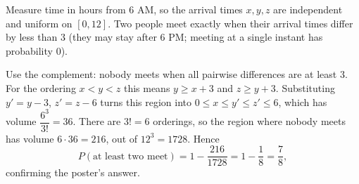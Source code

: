 Measure time in hours from 6 AM, so the arrival times $x,y,z$ are independent and uniform on $[0,12]$. Two people meet exactly when their arrival times differ by less than $3$ (they may stay after 6 PM; meeting at a single instant has probability $0$).

Use the complement: nobody meets when all pairwise differences are at least $3$. For the ordering $x<y<z$ this means $y\ge x+3$ and $z\ge y+3$. Substituting $y'=y-3$, $z'=z-6$ turns this region into $0\le x\le y'\le z'\le6$, which has volume $\dfrac{6^3}{3!}=36$. There are $3!=6$ orderings, so the region where nobody meets has volume $6\cdot36=216$, out of $12^3=1728$. Hence
\[
P(\text{at least two meet})=1-\dfrac{216}{1728}=1-\dfrac{1}{8}=\boxed{\dfrac{7}{8}},
\]
confirming the poster's answer.
